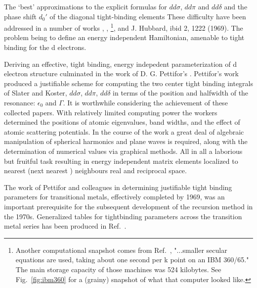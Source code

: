 The `best' approximations to the explicit formulas for $dd\sigma$, $dd\pi$ and $dd\delta$ and the phase
shift $d_{0}'$ of the diagonal tight-binding elements 
These difficulty have been addressed in a number of works 
\cite{hubbard67}, \cite{hubbard68}, \cite{hubbard69} \footnote{Another computational
snapshot comes from Ref.~\cite{hubbard69}, "...smaller secular 
equations are used, taking about one second per k point on an IBM  360/65." The
main storage capacity of those machines was 524 kilobytes. See Fig.~\ref{fig:ibm360}
for a (grainy) snapshot of what that computer looked like.},
and J. Hubbard, ibid 2, 1222 (1969). The problem being to define an
energy independent Hamiltonian, amenable to tight binding for the d electrons.

Deriving an effective, tight binding, energy indepedent parameterization
of d electron structure  culminated in the work of D. G. Pettifor's \cite{pettifor69}. 
Pettifor's work produced a justifiable scheme for computing the two center tight binding integrals of Slater
and Koster, $dd\sigma$, $dd\pi$, $dd\delta$ in terms of the position and halfwidth of the resonance:
$\epsilon_0$ and $\Gamma$. It is worthwhile considering the achievement of these collected papers.
With relatively limited computing power the workers determined 
the positions of atomic eigenvalues, band widths, and the effect 
of atomic scattering potentials. In 
the course of the work a great deal of algebraic manipulation of spherical 
harmonics and plane waves is required, along with the determination
of numerical values via graphical methods. All in all a laborious but fruitful task resulting
in energy independent matrix elements localized to nearest (next nearest ) 
neighbours real and reciprocal space.

The work of Pettifor and colleagues in determining justifiable tight 
binding parameters for transitional metals, 
effectively completed by 1969, was an important prerequisite for the subsequent 
development of the recursion method in the 1970s. Generalized tables for tightbinding parameters 
across the transition metal series has been produced in Ref.~\cite{harrison80}.


